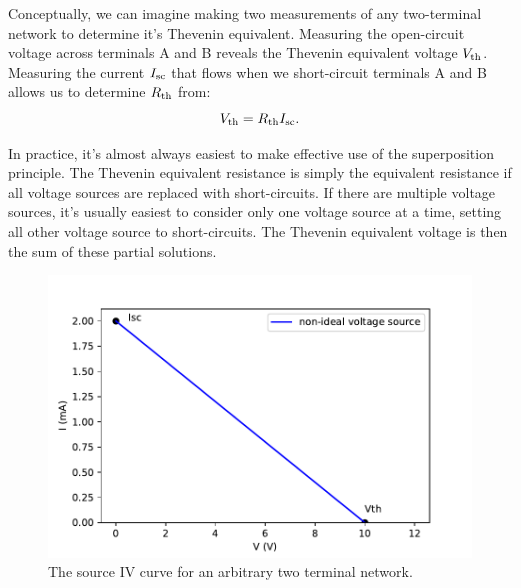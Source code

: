 Conceptually, we can imagine making two measurements of any two-terminal network to determine it's Thevenin equivalent.  Measuring the open-circuit voltage across terminals A and B reveals the Thevenin equivalent voltage $V_{\rm th}$.  Measuring the current $I_{\rm sc}$ that flows when we short-circuit terminals A and B allows us to determine $R_{\rm th}$ from:
\begin{displaymath}
V_{\rm th} = R_{\rm th} I_{\rm sc}.
\end{displaymath}

In practice, it's almost always easiest to make effective use of the superposition principle.  The Thevenin equivalent resistance is simply the equivalent resistance if all voltage sources are replaced with short-circuits.  If there are multiple voltage sources, it's usually easiest to consider only one voltage source at a time, setting all other voltage source to short-circuits.  The Thevenin equivalent voltage is then the sum of these partial solutions.

\begin{figure}[htbp]
\begin{center}
\includegraphics[height=0.3\textheight]{figs/thevenin.pdf} 
\caption{ The source IV curve for an arbitrary two terminal network.}
\label{fig:thevenin_source}
\end{center}
\end{figure}

